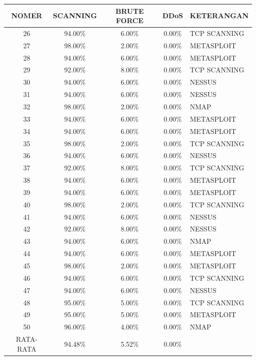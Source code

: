 \begin{table}[H]
\centering
\begin{tabular}{|c|c|c|c|l|}
	\hline
		NOMER        & SCANNING & BRUTE FORCE & DDoS   & KETERANGAN   \\ \hline

		26        & 94.00\%  & 6.00\%      & 0.00\% & TCP SCANNING \\ \hline
		27        & 98.00\%  & 2.00\%      & 0.00\% & METASPLOIT   \\ \hline
		28        & 94.00\%  & 6.00\%      & 0.00\% & METASPLOIT   \\ \hline
		29        & 92.00\%  & 8.00\%      & 0.00\% & TCP SCANNING \\ \hline	
		30        & 94.00\%  & 6.00\%      & 0.00\% & NESSUS       \\ \hline
		31        & 94.00\%  & 6.00\%      & 0.00\% & NESSUS       \\ \hline
		32        & 98.00\%  & 2.00\%      & 0.00\% & NMAP         \\ \hline
		33        & 94.00\%  & 6.00\%      & 0.00\% & METASPLOIT   \\ \hline
		34        & 94.00\%  & 6.00\%      & 0.00\% & METASPLOIT   \\ \hline
		35        & 98.00\%  & 2.00\%      & 0.00\% & TCP SCANNING \\ \hline
		36        & 94.00\%  & 6.00\%      & 0.00\% & NESSUS       \\ \hline
		37        & 92.00\%  & 8.00\%      & 0.00\% & TCP SCANNING \\ \hline
		38        & 94.00\%  & 6.00\%      & 0.00\% & METASPLOIT   \\ \hline
		39        & 94.00\%  & 6.00\%      & 0.00\% & METASPLOIT   \\ \hline
		40        & 98.00\%  & 2.00\%      & 0.00\% & TCP SCANNING \\ \hline
		41        & 94.00\%  & 6.00\%      & 0.00\% & NESSUS       \\ \hline
		42        & 92.00\%  & 8.00\%      & 0.00\% & NESSUS       \\ \hline
		43        & 94.00\%  & 6.00\%      & 0.00\% & NMAP         \\ \hline
		44        & 94.00\%  & 6.00\%      & 0.00\% & METASPLOIT   \\ \hline
		45        & 98.00\%  & 2.00\%      & 0.00\% & METASPLOIT   \\ \hline
		46        & 94.00\%  & 6.00\%      & 0.00\% & TCP SCANNING \\ \hline
		47        & 94.00\%  & 6.00\%      & 0.00\% & NESSUS       \\ \hline
		48        & 95.00\%  & 5.00\%      & 0.00\% & TCP SCANNING \\ \hline
		49        & 95.00\%  & 5.00\%      & 0.00\% & METASPLOIT   \\ \hline
		50        & 96.00\%  & 4.00\%      & 0.00\% & NMAP         \\ \hline
		RATA-RATA & 94.48\%  & 5.52\%      & 0.00\% &              \\ \hline
	\end{tabular}
\end{table}



